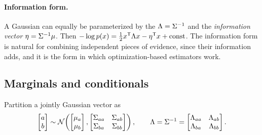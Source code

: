 \paragraph{Information form.} A Gaussian can equally be parameterized by the  $\Lambda = \Sigma^{-1}$ and the
\emph{information vector} $\eta = \Sigma^{-1}\mu$. Then $-\log p(x) = \tfrac12 x^{\mathsf{T}}\Lambda x - \eta^{\mathsf{T}} x + \text{const}$. The information form is natural
for combining independent pieces of evidence, since their information adds, and it is the form in which optimization-based estimators work.

\subsection{Marginals and conditionals}

Partition a jointly Gaussian vector as
\begin{equation}
  \begin{bmatrix} a \\ b \end{bmatrix} \sim
  \mathcal{N}\!\left( \begin{bmatrix} \mu_a \\ \mu_b \end{bmatrix},
  \begin{bmatrix} \Sigma_{aa} & \Sigma_{ab} \\ \Sigma_{ba} & \Sigma_{bb} \end{bmatrix} \right),
  \qquad
  \Lambda = \Sigma^{-1} = \begin{bmatrix} \Lambda_{aa} & \Lambda_{ab} \\ \Lambda_{ba} & \Lambda_{bb} \end{bmatrix}.
\end{equation}

